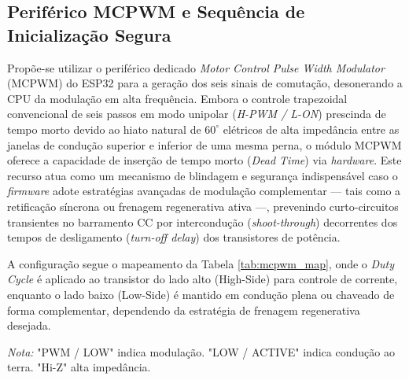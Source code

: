 \subsection{Periférico MCPWM e Sequência de Inicialização Segura}
\label{subsec:mcpwm_metodo_inicializacao}
Propõe-se utilizar o periférico dedicado \textit{Motor Control Pulse Width Modulator} (MCPWM) do ESP32 \cite{esp32-technical-reference-manual} para a geração dos seis sinais de comutação, desonerando a CPU da modulação em alta frequência. Embora o controle trapezoidal convencional de seis passos em modo unipolar (\textit{H-PWM / L-ON}) prescinda de tempo morto devido ao hiato natural de $60^\circ$ elétricos de alta impedância entre as janelas de condução superior e inferior de uma mesma perna, o módulo MCPWM oferece a capacidade de inserção de tempo morto (\textit{Dead Time}) via \textit{hardware}. Este recurso atua como um mecanismo de blindagem e segurança indispensável caso o \textit{firmware} adote estratégias avançadas de modulação complementar — tais como a retificação síncrona ou frenagem regenerativa ativa —, prevenindo curto-circuitos transientes no barramento CC por intercondução (\textit{shoot-through}) decorrentes dos tempos de desligamento (\textit{turn-off delay}) dos transistores de potência.

A configuração segue o mapeamento da Tabela \ref{tab:mcpwm_map}, onde o \textit{Duty Cycle} é aplicado ao transistor do lado alto (High-Side) para controle de corrente, enquanto o lado baixo (Low-Side) é mantido em condução plena ou chaveado de forma complementar, dependendo da estratégia de frenagem regenerativa desejada.

\begin{table}[H]
    \centering
    \caption{Mapeamento dos Estados de Comutação para os Geradores MCPWM do ESP32}
    \label{tab:mcpwm_map}
    {\footnotesize\textit{Nota:} "PWM / LOW" indica modulação. "LOW / ACTIVE" indica condução ao terra. "Hi-Z" alta impedância.}
\end{table}


